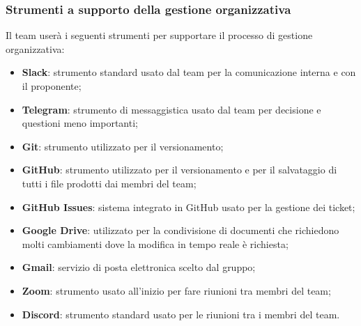 \subsubsection{Strumenti a supporto della gestione organizzativa}
Il team userà i seguenti strumenti per supportare il processo di gestione organizzativa:
\begin{itemize}
\item \textbf{Slack}: strumento standard usato dal team per la comunicazione interna e con il proponente;
\item \textbf{Telegram}: strumento di messaggistica usato dal team per decisione e questioni meno importanti; 
\item \textbf{Git}: strumento utilizzato per il versionamento;
\item \textbf{GitHub}: strumento utilizzato per il versionamento e per il salvataggio di tutti i file prodotti dai membri del team; 
\item \textbf{GitHub Issues}: sistema integrato in GitHub usato per la gestione dei ticket;
\item \textbf{Google Drive}: utilizzato per la condivisione di documenti che richiedono molti cambiamenti dove la modifica in tempo reale è richiesta;
\item \textbf{Gmail}: servizio di posta elettronica scelto dal gruppo;
\item \textbf{Zoom}: strumento usato all'inizio per fare riunioni tra membri del team;
\item \textbf{Discord}: strumento standard usato per le riunioni tra i membri del team. 
\end{itemize}